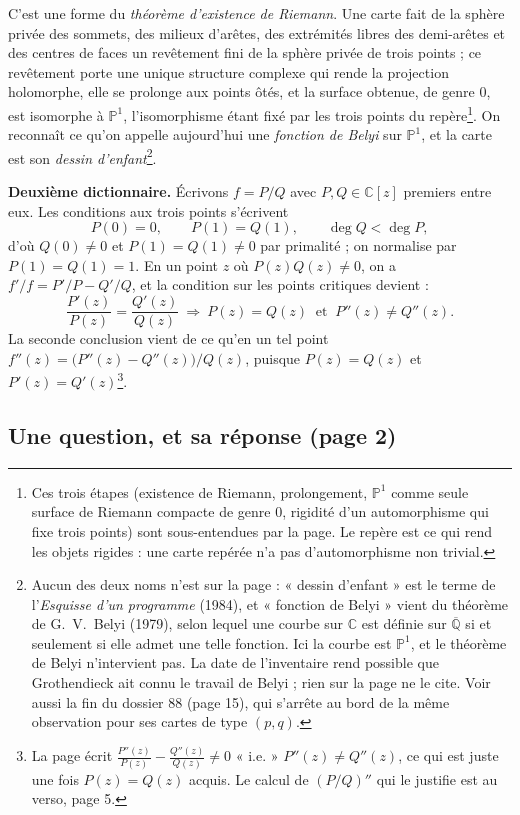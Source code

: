 \documentclass[11pt,a4paper]{article}
\begin{document}
C'est une forme du \emph{théorème d'existence de Riemann}. Une carte fait de
la sphère privée des sommets, des milieux d'arêtes, des extrémités libres
des demi-arêtes et des centres de faces un revêtement fini de la sphère privée de trois points ; ce revêtement porte une
unique structure complexe qui rende la projection holomorphe, elle se
prolonge aux points ôtés, et la surface obtenue, de genre $0$, est isomorphe à
$\mathbb{P}^1$, l'isomorphisme étant fixé par les trois points du
repère\footnote{Ces trois étapes (existence de Riemann, prolongement, $\mathbb{P}^1$
comme seule surface de Riemann compacte de genre $0$, rigidité d'un
automorphisme qui fixe trois points) sont sous-entendues par la page. Le
repère est ce qui rend les objets rigides : une carte repérée n'a pas
d'automorphisme non trivial.}. On reconnaît ce qu'on appelle aujourd'hui une
\emph{fonction de Belyi} sur $\mathbb{P}^1$, et la carte est son \emph{dessin
d'enfant}\footnote{Aucun des deux noms n'est sur la page : « dessin
d'enfant » est le terme de l'\emph{Esquisse d'un programme} (1984), et
« fonction de Belyi » vient du théorème de G.~V.~Belyi (1979), selon lequel
une courbe sur $\mathbb{C}$ est définie sur $\overline{\mathbb{Q}}$ si et
seulement si elle admet une telle fonction. Ici la courbe est
$\mathbb{P}^1$, et le théorème de Belyi n'intervient pas. La date de
l'inventaire rend possible que Grothendieck ait connu le travail de Belyi ;
rien sur la page ne le cite. Voir aussi la fin du dossier 88 (page 15), qui
s'arrête au bord de la même observation pour ses cartes de type $(p,q)$.}.

\textbf{Deuxième dictionnaire.} Écrivons $f = P/Q$ avec $P, Q \in
\mathbb{C}[z]$ premiers entre eux. Les conditions aux trois points
s'écrivent
\[
P(0) = 0, \qquad P(1) = Q(1), \qquad \deg Q < \deg P,
\]
d'où $Q(0) \neq 0$ et $P(1) = Q(1) \neq 0$ par primalité ; on normalise par
$P(1) = Q(1) = 1$. En un point $z$ où $P(z) Q(z) \neq 0$, on a
$f'/f = P'/P - Q'/Q$, et la condition sur les points critiques devient :
\[
\frac{P'(z)}{P(z)} = \frac{Q'(z)}{Q(z)} \ \Longrightarrow\ P(z) = Q(z)
\ \text{ et } \ P''(z) \neq Q''(z).
\]
La seconde conclusion vient de ce qu'en un tel point
$f''(z) = \bigl(P''(z) - Q''(z)\bigr)/Q(z)$, puisque $P(z) = Q(z)$ et
$P'(z) = Q'(z)$\footnote{La page écrit $\frac{P''(z)}{P(z)} -
\frac{Q''(z)}{Q(z)} \neq 0$ « i.e. » $P''(z) \neq Q''(z)$, ce qui est
juste une fois $P(z) = Q(z)$ acquis. Le calcul de $(P/Q)''$ qui le justifie
est au verso, page 5.}.

\subsection*{Une question, et sa réponse (page 2)}
\end{document}
